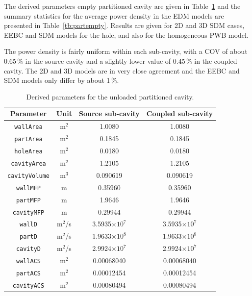 \documentclass[a4paper]{article}
\numberwithin{equation}{section}
\newcounter{Table}
\begin{document}
The derived parameters empty partitioned cavity are given in Table~\ref{tb:derivparamdu} and the summary 
statistics for the average power density in the EDM models are presented in Table~\ref{tb:partempty}. 
Results are given for 2D and 3D SDM cases, EEBC and SDM models for the hole, and also for the homogeneous 
PWB model. 

The power density is fairly uniform within each sub-cavity, with a COV of about 0.65\,\% in the source cavity
and a slightly lower value of 0.45\,\% in the coupled cavity. The 2D and 3D models are in very close agreement
and the EEBC and SDM models only differ by about 1\,\%.

\begin{table}[h]
\begin{center}
\begin{tabular}{|c|c|c|c|}
\hline
\textbf{Parameter}     &\textbf{Unit} &\textbf{Source sub-cavity} &\textbf{Coupled sub-cavity}\\ 
\hline
\texttt{wallArea}      &m$^2$         &1.0080                     &1.0080              \\
\texttt{partArea}      &m$^2$         &0.1845                     &0.1845              \\
\texttt{holeArea}      &m$^2$         &0.0180                     &0.0180              \\
\texttt{cavityArea}    &m$^2$         &1.2105                     &1.2105              \\
\texttt{cavityVolume}  &m$^3$         &0.090619                   &0.090619            \\
\texttt{wallMFP}       &m             &0.35960                    &0.35960             \\
\texttt{partMFP}       &m             &1.9646                     &1.9646              \\
\texttt{cavityMFP}     &m             &0.29944                    &0.29944             \\
\texttt{wallD}         &m$^2$/s       &3.5935$\times 10^7$        &3.5935$\times 10^7$ \\
\texttt{partD}         &m$^2$/s       &1.9633$\times 10^8$        &1.9633$\times 10^8$ \\
\texttt{cavityD}       &m$^2$/s       &2.9924$\times 10^7$        &2.9924$\times 10^7$ \\
\texttt{wallACS}       &m$^2$         &0.00068040                 &0.00068040          \\
\texttt{partACS}       &m$^2$         &0.00012454                 &0.00012454          \\
\texttt{cavityACS}     &m$^2$         &0.00080494                 &0.00080494          \\
\hline
\end{tabular}
\end{center}
\caption{\label{tb:derivparamdu} Derived parameters for the unloaded partitioned cavity.}
\end{table}
\end{document}
